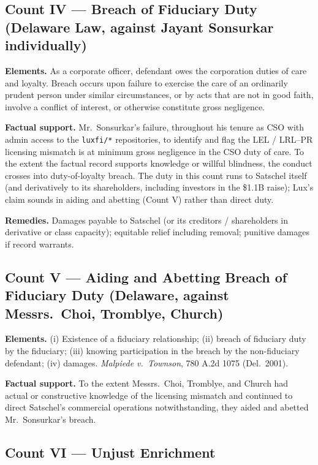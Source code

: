 \documentclass[11pt,letterpaper]{article}
\begin{document}
\subsection*{Count IV --- Breach of Fiduciary Duty (Delaware Law,
against Jayant Sonsurkar individually)}

\textbf{Elements.} As a corporate officer, defendant owes the
corporation duties of care and loyalty. Breach occurs upon failure to
exercise the care of an ordinarily prudent person under similar
circumstances, or by acts that are not in good faith, involve a
conflict of interest, or otherwise constitute gross negligence.

\textbf{Factual support.} Mr.\ Sonsurkar's failure, throughout his
tenure as CSO with admin access to the \texttt{luxfi/*} repositories,
to identify and flag the LEL / LRL--PR licensing mismatch is at
minimum gross negligence in the CSO duty of care. To the extent the
factual record supports knowledge or willful blindness, the conduct
crosses into duty-of-loyalty breach. The duty in this count runs
to Satschel itself (and derivatively to its shareholders, including
investors in the \$1.1B raise); Lux's claim sounds in aiding and
abetting (Count V) rather than direct duty.

\textbf{Remedies.} Damages payable to Satschel (or its creditors /
shareholders in derivative or class capacity); equitable relief
including removal; punitive damages if record warrants.

\subsection*{Count V --- Aiding and Abetting Breach of Fiduciary
Duty (Delaware, against Messrs.\ Choi, Tromblye, Church)}

\textbf{Elements.} (i) Existence of a fiduciary relationship; (ii)
breach of fiduciary duty by the fiduciary; (iii) knowing participation
in the breach by the non-fiduciary defendant; (iv) damages.
\emph{Malpiede v.\ Townson}, 780 A.2d 1075 (Del.\ 2001).

\textbf{Factual support.} To the extent Messrs.\ Choi, Tromblye, and
Church had actual or constructive knowledge of the licensing mismatch
and continued to direct Satschel's commercial operations notwithstanding,
they aided and abetted Mr.\ Sonsurkar's breach.

\subsection*{Count VI --- Unjust Enrichment}
\end{document}

